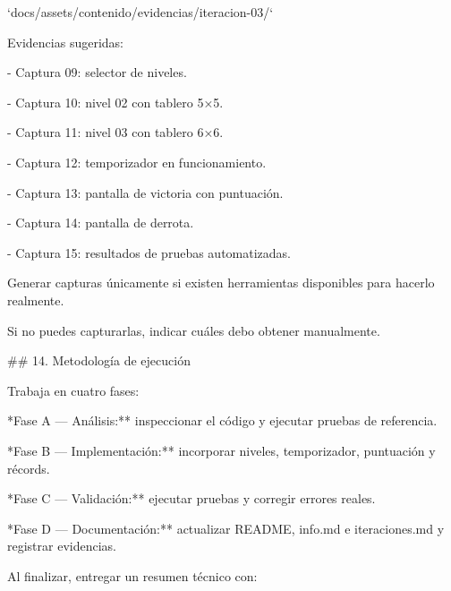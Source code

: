 \par\smallskip
\noindent `docs/assets/contenido/evidencias/iteracion-03/`\par
\par\smallskip
\noindent Evidencias sugeridas:\par
\par\smallskip
\noindent - Captura 09: selector de niveles.\par
\noindent - Captura 10: nivel 02 con tablero 5×5.\par
\noindent - Captura 11: nivel 03 con tablero 6×6.\par
\noindent - Captura 12: temporizador en funcionamiento.\par
\noindent - Captura 13: pantalla de victoria con puntuación.\par
\noindent - Captura 14: pantalla de derrota.\par
\noindent - Captura 15: resultados de pruebas automatizadas.\par
\par\smallskip
\noindent Generar capturas únicamente si existen herramientas disponibles para hacerlo realmente.\par
\par\smallskip
\noindent Si no puedes capturarlas, indicar cuáles debo obtener manualmente.\par
\par\smallskip
\noindent \#\# 14. Metodología de ejecución\par
\par\smallskip
\noindent Trabaja en cuatro fases:\par
\par\smallskip
\noindent **Fase A — Análisis:** inspeccionar el código y ejecutar pruebas de referencia.\par
\par\smallskip
\noindent **Fase B — Implementación:** incorporar niveles, temporizador, puntuación y récords.\par
\par\smallskip
\noindent **Fase C — Validación:** ejecutar pruebas y corregir errores reales.\par
\par\smallskip
\noindent **Fase D — Documentación:** actualizar README, info.md e iteraciones.md y registrar evidencias.\par
\par\smallskip
\noindent Al finalizar, entregar un resumen técnico con:\par
\par\smallskip
